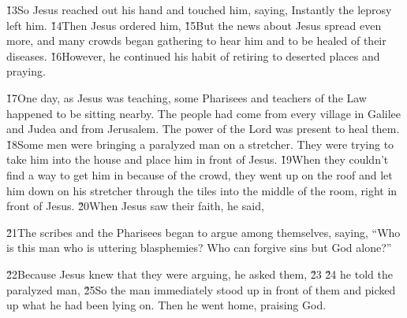 \v{13}So Jesus reached out his hand and touched him, saying,  Instantly the leprosy left him. \v{14}Then Jesus ordered him,  \v{15}But the news about Jesus spread even more, and many crowds began gathering to hear him and to be healed of their diseases. \v{16}However, he continued his habit of retiring to deserted places and praying.

\v{17}One day, as Jesus was teaching, some Pharisees and teachers of the Law happened to be sitting nearby. The people had come from every village in Galilee and Judea and from Jerusalem. The power of the Lord was present to heal them. \v{18}Some men were bringing a paralyzed man on a stretcher. They were trying to take him into the house and place him in front of Jesus. \v{19}When they couldn't find a way to get him in because of the crowd, they went up on the roof and let him down on his stretcher through the tiles into the middle of the room, right in front of Jesus. \v{20}When Jesus saw their faith, he said, 

\v{21}The scribes and the Pharisees began to argue among themselves, saying, ``Who is this man who is uttering blasphemies? Who can forgive sins but God alone?''

\v{22}Because Jesus knew that they were arguing, he asked them,  \v{23} \v{24} he told the paralyzed man,  \v{25}So the man immediately stood up in front of them and picked up what he had been lying on. Then he went home, praising God.

